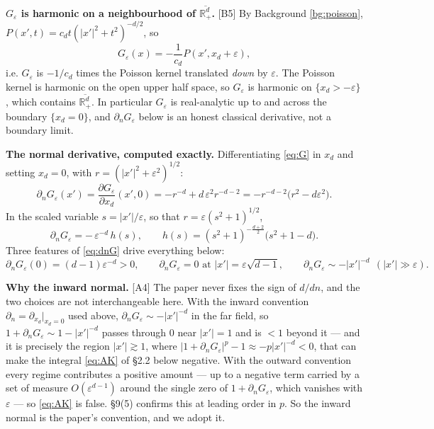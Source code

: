 \documentclass[11pt,reqno]{amsart}
\theoremstyle{plain}
\theoremstyle{definition}
\theoremstyle{plain}
\theoremstyle{definition}
\theoremstyle{remark}
\newcommand{\Rd}{\mathbb{R}^d_+}
\newcommand{\nd}{\partial_n}
\newcommand{\Ledger}[1]{{\scriptsize\textsf{[#1]}}}
\begin{document}
\begin{expansion}
\textbf{$G_\varepsilon$ is harmonic on a neighbourhood of $\overline{\Rd}$.}
\Ledger{B5} By Background \ref{bg:poisson},
$P(x',t)=c_dt(|x'|^2+t^2)^{-d/2}$, so
\[G_\varepsilon(x)=-\frac1{c_d}P(x',x_d+\varepsilon),\]
i.e. $G_\varepsilon$ is $-1/c_d$ times the Poisson kernel translated \emph{down}
by $\varepsilon$. The Poisson kernel is harmonic on the open upper half space, so
$G_\varepsilon$ is harmonic on $\{x_d>-\varepsilon\}$, which contains
$\overline{\Rd}$. In particular $G_\varepsilon$ is real-analytic up to and across
the boundary $\{x_d=0\}$, and $\nd G_\varepsilon$ below is an honest classical
derivative, not a boundary limit.
\end{expansion}

\begin{expansion}
\textbf{The normal derivative, computed exactly.} Differentiating \eqref{eq:G} in
$x_d$ and setting $x_d=0$, with $r=(|x'|^2+\varepsilon^2)^{1/2}$:
\[
 \nd G_\varepsilon(x')=\frac{\partial G_\varepsilon}{\partial x_d}(x',0)
  =-r^{-d}+d\,\varepsilon^2r^{-d-2}
  =-r^{-d-2}\bigl(r^2-d\varepsilon^2\bigr).
\]
In the scaled variable $s=|x'|/\varepsilon$, so that $r=\varepsilon(s^2+1)^{1/2}$,
\begin{equation}\label{eq:dnG}
  \nd G_\varepsilon= -\,\varepsilon^{-d}\,h(s),
  \qquad h(s)=(s^2+1)^{-\frac{d+2}2}\bigl(s^2+1-d\bigr).
\end{equation}
Three features of \eqref{eq:dnG} drive everything below:
\[
 \nd G_\varepsilon(0)=(d-1)\varepsilon^{-d}>0,\qquad
 \nd G_\varepsilon=0 \text{ at } |x'|=\varepsilon\sqrt{d-1},\qquad
 \nd G_\varepsilon\sim-|x'|^{-d}\ \ (|x'|\gg\varepsilon).
\]
\end{expansion}

\begin{filled}
\textbf{Why the inward normal.} \Ledger{A4} The paper never fixes the sign of
$d/dn$, and the two choices are not interchangeable here. With the inward
convention $\nd=\partial_{x_d}|_{x_d=0}$ used above, $\nd G_\varepsilon\sim-|x'|^{-d}$
in the far field, so $1+\nd G_\varepsilon\sim1-|x'|^{-d}$ passes through $0$ near
$|x'|=1$ and is $<1$ beyond it --- and it is precisely the region
$|x'|\gtrsim1$, where $|1+\nd G_\varepsilon|^p-1\approx-p|x'|^{-d}<0$, that can
make the integral \eqref{eq:AK} of \S2.2 below negative. With the outward convention every
regime contributes a positive amount --- up to a negative term carried by a set of
measure $O(\varepsilon^{d-1})$ around the single zero of $1+\nd G_\varepsilon$, which
vanishes with $\varepsilon$ --- so \eqref{eq:AK} is false. \S9(5) confirms this at
leading order in $p$. So the inward normal is the paper's convention, and we adopt it.
\end{filled}
\end{document}
